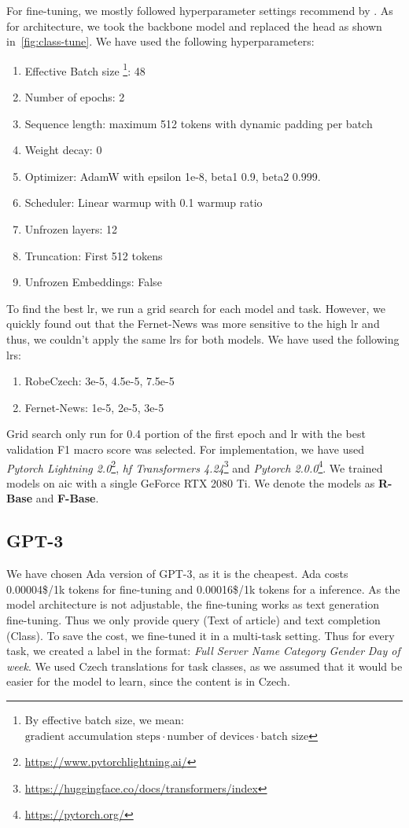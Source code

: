For fine-tuning, we mostly followed hyperparameter settings
recommend by \textcite{sunHowFineTuneBERT2020}.
As for architecture, we took the backbone model and replaced
the head as shown in~\autoref{fig:class-tune}.
We have used the following hyperparameters:
\begin{enumerate}
    \item Effective Batch size
    \footnote{By effective batch size, we mean:  
    $\textrm{gradient accumulation steps} \cdot \textrm{number of devices}
    \cdot \textrm{batch size}$
    }: 48
    \item Number of epochs: 2
    \item Sequence length: maximum 512 tokens with dynamic padding per batch
    \item Weight decay: 0
    \item Optimizer: AdamW with epsilon 1e-8, beta1 0.9, beta2 0.999.
    \item Scheduler: Linear warmup with 0.1 warmup ratio
    \item Unfrozen layers: 12
    \item Truncation: First 512 tokens
    \item Unfrozen Embeddings: False
\end{enumerate}
To find the best \ac{lr}, we run a grid search for each model and task.
However, we quickly found out that the Fernet-News was more sensitive to the high \ac{lr}
and thus, we couldn't apply the same \acp{lr} for both models.
We have used the following \acp{lr}:
\begin{enumerate}
    \item RobeCzech: 3e-5, 4.5e-5, 7.5e-5
    \item Fernet-News: 1e-5, 2e-5, 3e-5
\end{enumerate}
Grid search only run for 0.4 portion of the first epoch and \ac{lr} with the best validation 
F1 macro score was selected.
For implementation, we have used \textit{Pytorch Lightning 2.0}\footnote{\url{https://www.pytorchlightning.ai/}},
\textit{\ac{hf} Transformers 4.24}\footnote{\url{https://huggingface.co/docs/transformers/index}}
and \textit{Pytorch 2.0.0}\footnote{\url{https://pytorch.org/}}.
We trained models on \ac{aic} with a single GeForce RTX 2080 Ti.
We denote the models as \textbf{R-Base} and \textbf{F-Base}.

\subsection{GPT-3}
\label{sec:gpt-3}
We have chosen Ada version of GPT-3, as it is the cheapest.
Ada costs 0.00004\$/1k tokens for fine-tuning and 0.00016\$/1k tokens for a inference.
As the model architecture is not adjustable, the fine-tuning works
as text generation fine-tuning.
Thus we only provide query (Text of article) and text completion (Class).
To save the cost, we fine-tuned it in a multi-task setting.
Thus for every task, we created a label in the format: \textit{Full Server Name} \textit{Category} \textit{Gender} \textit{Day of week}.
We used Czech translations for task classes, as we assumed that it would be easier for the model to learn,
since the content is in Czech.

